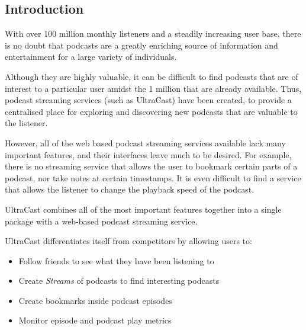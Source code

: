 \documentclass[../report.tex]{subfiles}
\begin{document}
   

\subsection{Introduction}

With over 100 million monthly listeners\cite{musicoomph} and a steadily increasing user base, there is no doubt that podcasts are a greatly enriching source of information and entertainment for a large variety of individuals.

Although they are highly valuable, it can be difficult to find podcasts that are of interest to a particular user amidst the 1 million\cite{musicoomph} that are already available.
Thus, podcast streaming services (such as UltraCast) have been created, to provide a centralised place for exploring and discovering new podcasts that are valuable to the listener.

However, all of the web based podcast streaming services available lack many important features, and their interfaces leave much to be desired. For example, there is no streaming service that allows the user to bookmark certain parts of a podcast, nor take notes at certain timestamps. It is even difficult to find a service that allows the listener to change the playback speed of the podcast.

UltraCast combines all of the most important features together into a single package with a web-based podcast streaming service.

UltraCast differentiates itself from competitors by allowing users to:
\begin{itemize}
    \item Follow friends to see what they have been listening to
    \item Create \textit{Streams} of podcasts to find interesting podcasts
    \item Create bookmarks inside podcast episodes
    \item Monitor episode and podcast play metrics
\end{itemize}
\end{document}
